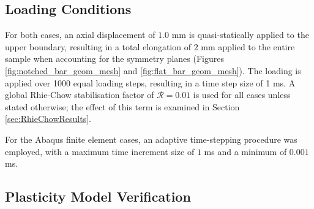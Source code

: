 \documentclass[sn-mathphys,Numbered]{sn-jnl}%
\begin{document}
\subsection{Loading Conditions}

For both cases, an axial displacement of $1.0$ mm is quasi-statically applied to the upper boundary, resulting in a total elongation of $2$ mm applied to the entire sample when accounting for the symmetry planes (Figures \ref{fig:notched_bar_geom_mesh} and \ref{fig:flat_bar_geom_mesh}).
The loading is applied over 1000 equal loading steps, resulting in a time step size of 1 ms.
A global Rhie-Chow stabilisation factor of $\mathcal{R} = 0.01$ is used for all cases unless stated otherwise; the effect of this term is examined in Section \ref{sec:RhieChowResults}.


For the Abaqus finite element cases, an adaptive time-stepping procedure was employed, with a maximum time increment size of $1$ ms and a minimum of $0.001$ ms.




\subsection{Plasticity Model Verification} \label{PlasticityTestCases}
\end{document}
